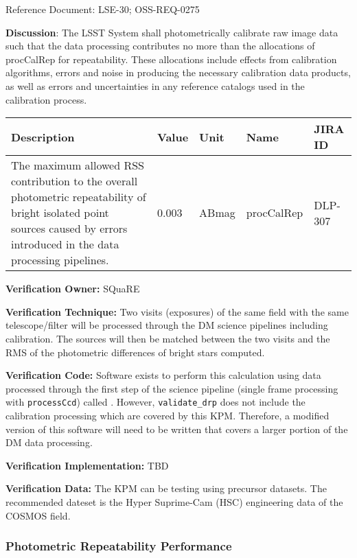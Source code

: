 \documentclass[DM,lsstdraft,toc]{lsstdoc}
\begin{document}
Reference Document: LSE-30; OSS-REQ-0275

\textbf{Discussion}: The LSST System shall photometrically calibrate raw
image data such that the data processing contributes no more than the
allocations of procCalRep for repeatability. These allocations include
effects from calibration algorithms, errors and noise in producing the
necessary calibration data products, as well as errors and uncertainties
in any reference catalogs used in the calibration process.

\begin{longtable}[]{@{}p{}llll@{}}
\toprule
Description & Value & Unit & Name & JIRA ID\tabularnewline
\midrule
\endhead
The maximum allowed RSS contribution to the overall photometric
repeatability of bright isolated point sources caused by errors
introduced in the data processing pipelines. & 0.003 & ABmag &
procCalRep & DLP-307\tabularnewline
\bottomrule
\end{longtable}

\textbf{Verification Owner:} SQuaRE

\textbf{Verification Technique:} Two visits (exposures) of the same
field with the same telescope/filter will be processed through the DM
science pipelines including calibration. The sources will then be
matched between the two visits and the RMS of the photometric
differences of bright stars computed.

\textbf{Verification Code:} Software exists to perform this calculation
using data processed through the first step of the science pipeline
(single frame processing with \texttt{processCcd}) called . However, \texttt{validate\_drp}
does not include the calibration processing which are covered by this
KPM. Therefore, a modified version of this software will need to be
written that covers a larger portion of the DM data processing.

\textbf{Verification Implementation:} TBD

\textbf{Verification Data:} The KPM can be testing using precursor
datasets. The recommended dateset is the Hyper Suprime-Cam (HSC)
engineering data of the COSMOS field.

\subsubsection{Photometric Repeatability
Performance}\label{photometric-repeatability-performance}
\end{document}
